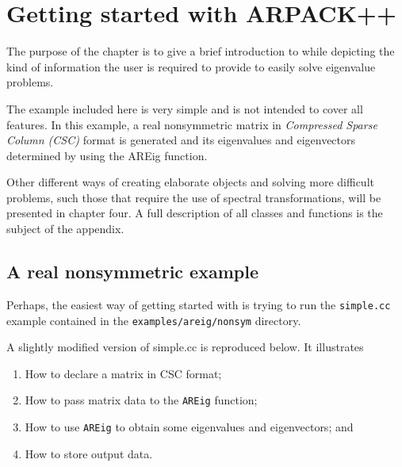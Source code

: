 \chapter{Getting started with ARPACK++}

The purpose of the chapter is to give a brief introduction to \ARPP{} while depicting the kind of information the user is required to provide to easily solve eigenvalue problems.

The example included here is very simple and is not intended to cover all \ARPP{} features. In this example, a real nonsymmetric matrix in \textit{Compressed Sparse Column (CSC)} format is generated and its eigenvalues and eigenvectors determined by using the AREig function.

Other different ways of creating elaborate \ARPP{} objects and solving more difficult problems, such those that require the use of spectral transformations, will be presented in chapter four. A full description of all \ARPP{} classes and functions is the subject of the appendix.

\section{A real nonsymmetric example}

Perhaps, the easiest way of getting started with \ARPP{} is trying to run the \texttt{simple.cc} example contained in the \texttt{examples/areig/nonsym} directory.

A slightly modified version of simple.cc is reproduced below. It illustrates 
\begin{enumerate}
	\item How to declare a matrix in CSC format;
	\item How to pass matrix data to the \texttt{AREig} function;
	\item How to use \texttt{AREig} to obtain some eigenvalues and eigenvectors; and
	\item How to store output data.
\end{enumerate}

